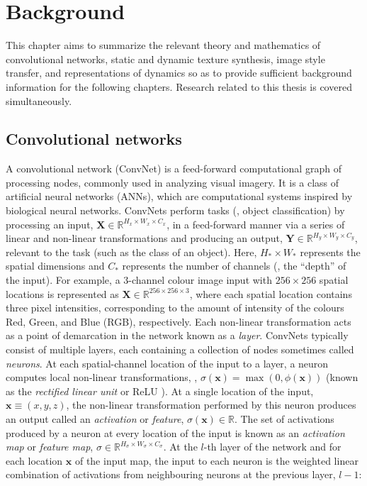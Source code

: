\chapter{Background}\label{chap:background}

This chapter aims to summarize the relevant theory and mathematics of
convolutional networks,
static and dynamic texture synthesis, image style transfer, and representations of dynamics so as to provide sufficient
background information for the following chapters. Research
related to this thesis is covered simultaneously.

\section{Convolutional networks}

A convolutional network (ConvNet) is a feed-forward computational graph of processing nodes, commonly used in analyzing visual imagery. It is a class of artificial neural networks (ANNs), which are computational systems inspired by biological neural networks. ConvNets perform tasks (\eg, object classification) by processing an input, $\mathbf{X} \in \mathbb{R}^{H_x \times W_x \times C_x}$, in a feed-forward manner via a series of linear and non-linear transformations and producing an output, $\mathbf{Y} \in \mathbb{R}^{H_y \times W_y \times C_y}$, relevant to the task (such as the class of an object). Here, $H_\ast \times W_\ast$ represents the spatial dimensions and $C_\ast$ represents the number of channels (\ie, the ``depth'' of the input). For example, a $3$-channel colour image input with $256 \times 256$ spatial locations is represented as $\mathbf{X} \in \mathbb{R}^{256 \times 256 \times 3}$, where each spatial location contains three pixel intensities, corresponding to the amount of intensity of the colours Red, Green, and Blue (RGB), respectively. Each non-linear transformation acts as a point of demarcation in the network known as a \emph{layer}. ConvNets typically consist of multiple layers, each containing a collection of nodes sometimes called \emph{neurons}. At each spatial-channel location of the input to a layer, a neuron computes local non-linear transformations, \eg, $\sigma(\mathbf{x}) = \max{(0, \phi(\mathbf{x}))}$ (known as the \emph{rectified linear unit} or ReLU \cite{nair2010rectified}). At a single location of the input, $\mathbf{x} \equiv (x, y, z)$, the non-linear transformation performed by this neuron produces an output called an \emph{activation} or \emph{feature}, $\sigma(\mathbf{x}) \in \mathbb{R}$. The set of activations produced by a neuron at every location of the input is known as an \emph{activation map} or \emph{feature map}, $\sigma \in \mathbb{R}^{H_\sigma \times W_\sigma \times C_\sigma}$. At the $l$-th layer of the network and for each location $\mathbf{x}$ of the input map, the input to each neuron is the weighted linear combination of activations from neighbouring neurons at the previous layer, $l-1$:
